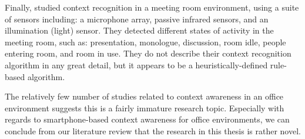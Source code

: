 

Finally, \cite{Park2015} %
studied context recognition in a meeting room environment, using a suite of sensors including: a microphone array, passive infrared sensors, and an illumination (light) sensor. They detected different states of activity in the meeting room, such as: presentation, monologue, discussion, room idle, people entering room, and room in use. They do not describe their context recognition algorithm in any great detail, but it appears to be a heuristically-defined rule-based algorithm.

The relatively few number of studies related to context awareness in an office environment suggests this is a fairly immature research topic. Especially with regards to smartphone-based context awareness for office environments, we can conclude from our literature review that the research in this thesis is rather novel.
%
